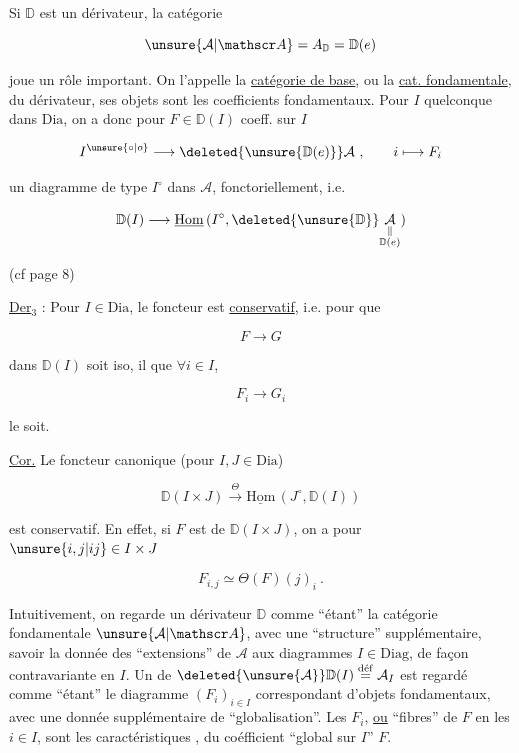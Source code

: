 Si $\mathbb D$ est un dérivateur, la catégorie

\[
\unsure{\mathcal A|\mathscr A}=A_{\mathbb D}=\mathbb D(e)
\]

joue un rôle important. On l'appelle la \uline{catégorie de base}, ou la \uline{cat. fondamentale}, du dérivateur, ses objets sont les coefficients fondamentaux. Pour $I$ quelconque dans $\mathrm{Dia}$, on a donc pour $F\in\mathbb D(I)$ coeff. sur $I$

\[
I^{\unsure{\circ|o}}\longrightarrow\deleted{\unsure{\mathbb D(e)}}\mathcal A\ ,\qquad i\longmapsto F_{i}
\]

un diagramme de type $I^{\circ}$ dans $\mathcal A$, fonctoriellement, i.e.

\[
\mathbb D(I)\longrightarrow\underline{\mathrm{Hom}}\,(I^{\circ},\deleted{\unsure{\mathbb D}}\underset{\substack{\Vert\\\mathbb D(e)}}{\mathcal A})
\]

(cf page 8)

\uline{Der}$_3$ : Pour  $I\in\mathrm{Dia}$, le foncteur est \uline{conservatif}, i.e. pour que


\[
F\longrightarrow G
\]

dans $\mathbb D(I)$ soit iso, il  que $\forall i\in I$,

\[
F_{i}\longrightarrow G_{i}
\]

le soit.

\uline{Cor.} Le foncteur canonique (pour $I,J\in\mathrm{Dia}$)

\[
\mathbb D(I\times J)\overset{\Theta}{\longrightarrow}\underline{\mathrm{Hom}}\,(J^{\circ},\mathbb D(I))
\]

est conservatif. En effet, si $F$ est de $\mathbb D(I\times J)$, on a pour $\unsure{i,j|ij}\in I\times J$

\[
F_{i,j}\simeq\Theta(F)(j)_{i}\ .
\]


\margin{$\times$}

Intuitivement, on regarde un dérivateur $\mathbb D$ comme ``étant'' la catégorie fondamentale $\unsure{\mathcal A|\mathscr A}$, avec une ``structure'' supplémentaire, savoir la donnée des ``extensions'' de $\mathcal A$ \margin{$\longrightarrow$} aux diagrammes $I\in\mathrm{Diag}$, de façon contravariante en $I$. Un  de $\deleted{\unsure{\mathcal A}}\mathbb D(I)\overset{\mathrm{d\acute ef}}{=}\mathcal A_{I}$ est regardé comme ``étant'' le diagramme $(F_{i})_{i\in I}$ correspondant d'objets fondamentaux, avec une donnée supplémentaire de ``globalisation''. Les $F_{i}$,  \uline{ou} ``fibres'' de $F$ en les $i\in I$, sont les caractéristiques , du coéfficient ``global sur $I$'' $F$.


